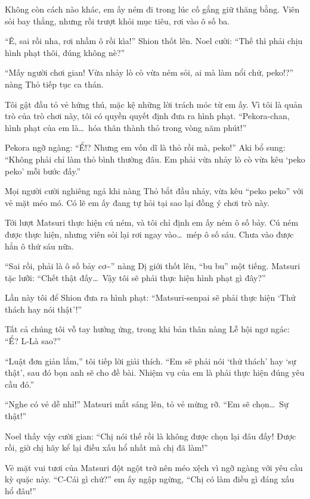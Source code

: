 \documentclass[../main.tex]{subfiles}
\begin{document}
Không còn cách nào khác, em ấy ném đi trong lúc cố gắng giữ thăng bằng. Viên sỏi bay thẳng, nhưng rồi trượt khỏi mục tiêu, rơi vào ô số ba.

``Ê, sai rồi nha, rơi nhầm ô rồi kìa!'' Shion thốt lên. Noel cười: ``Thế thì phải chịu hình phạt thôi, đúng không nè?''

``Mấy người chơi gian! Vừa nhảy lò cò vừa ném sỏi, ai mà làm nổi chứ, peko!?'' nàng Thỏ tiếp tục ca thán.

Tôi gật đầu tỏ vẻ hứng thú, mặc kệ những lời trách móc từ em ấy. Vì tôi là quản trò của trò chơi này, tôi có quyền quyết định đưa ra hình phạt. ``Pekora-chan, hình phạt của em là\dots\ hóa thân thành thỏ trong vòng năm phút!''

Pekora ngỡ ngàng: ``Ể!? Nhưng em vốn dĩ là thỏ rồi mà, peko!'' Aki bổ sung: ``Không phải chỉ làm thỏ bình thường đâu. Em phải vừa nhảy lò cò vừa kêu `peko peko' mỗi bước đấy.''

Mọi người cười nghiêng ngả khi nàng Thỏ bắt đầu nhảy, vừa kêu ``peko peko'' với vẻ mặt méo mó. Có lẽ em ấy đang tự hỏi tại sao lại đồng ý chơi trò này.

\ct

Tới lượt Matsuri thực hiện cú ném, và tôi chỉ định em ấy ném ô số bảy. Cú ném được thực hiện, nhưng viên sỏi lại rơi ngay vào\dots\ mép ô số sáu. Chưa vào được hẳn ô thứ sáu nữa.

``Sai rồi, phải là ô số bảy cơ\~{}'' nàng Dị giới thốt lên, ``bu bu'' một tiếng. Matsuri tặc lưỡi: ``Chết thật đấy\dots\ Vậy tôi sẽ phải thực hiện hình phạt gì đây?''

Lần này tôi để Shion đưa ra hình phạt: ``Matsuri-senpai sẽ phải thực hiện `Thử thách hay nói thật'!''

Tất cả chúng tôi vỗ tay hưởng ứng, trong khi bản thân nàng Lễ hội ngơ ngác: ``Ể? L-Là sao?''

``Luật đơn giản lắm,'' tôi tiếp lời giải thích. ``Em sẽ phải nói `thử thách' hay `sự thật', sau đó bọn anh sẽ cho đề bài. Nhiệm vụ của em là phải thực hiện đúng yêu cầu đó.''

``Nghe có vẻ dễ nhỉ!'' Matsuri mắt sáng lên, tỏ vẻ mừng rỡ. ``Em sẽ chọn\dots\ Sự thật!''

Noel thấy vậy cười gian: ``Chị nói thế rồi là không được chọn lại đâu đấy! Được rồi, giờ chị hãy kể lại điều xấu hổ nhất mà chị đã làm!''

Vẻ mặt vui tươi của Matsuri đột ngột trở nên méo xệch vì ngỡ ngàng với yêu cầu kỳ quặc này. ``C-Cái gì chứ?'' em ấy ngập ngừng, ``Chị có làm điều gì đáng xấu hổ đâu!''
\end{document}
